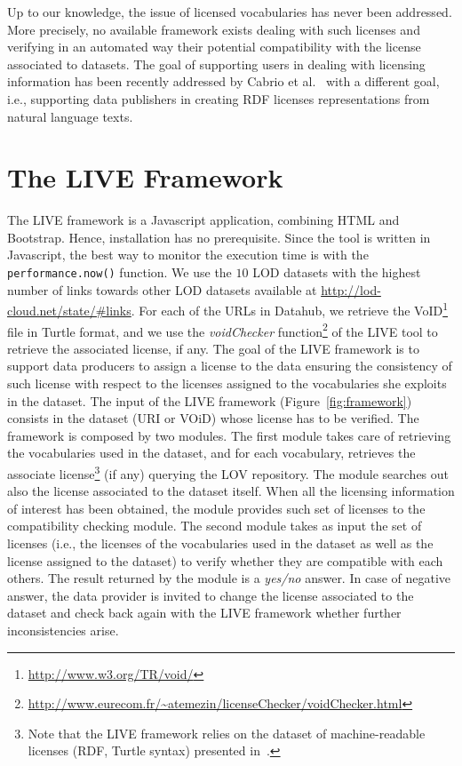 Up to our knowledge, the issue of licensed vocabularies has never been addressed. More precisely, no available framework exists dealing with such licenses and verifying in an automated way their potential compatibility with the license associated to datasets. The goal of supporting users in dealing with licensing information has been recently addressed by Cabrio et al.~\cite{CabrioESWC2014} with a different goal, i.e., supporting data publishers in creating RDF licenses representations from natural language texts. 

\section{The LIVE Framework}
\label{sec:live}
The LIVE framework is a Javascript application, combining HTML and Bootstrap. Hence, installation has no prerequisite. Since the tool is written in Javascript, the best way to monitor the execution time is with the \texttt{performance.now()} function. We use the $10$ LOD datasets with the highest number of links towards other LOD datasets available at \url{http://lod-cloud.net/state/#links}. For each of the URLs in Datahub, we retrieve the VoID\footnote{\url{http://www.w3.org/TR/void/}} file in Turtle format, and we use the \textit{voidChecker} function\footnote{\url{http://www.eurecom.fr/~atemezin/licenseChecker/voidChecker.html}} of the LIVE tool to retrieve the associated license, if any.  
The goal of the LIVE framework is to support data producers to assign a license to the data ensuring the consistency of such license with respect to the licenses assigned to the vocabularies she exploits in the dataset. 
The input of the LIVE framework (Figure~\ref{fig:framework}) consists in the dataset (URI or VOiD) whose license has to be verified. The framework is composed by two modules. The first module takes care of retrieving the vocabularies used in the dataset, and for each vocabulary, retrieves the associate license\footnote{Note that the LIVE framework relies on the dataset of machine-readable licenses (RDF, Turtle syntax) presented in~\cite{CabrioESWC2014}.} (if any) querying the LOV repository. 
The module searches out also the license associated to the dataset itself. When all the licensing information of interest has been obtained, the module provides such set of licenses to the compatibility checking module. 
The second module takes as input the set of licenses (i.e., the licenses of the vocabularies used in the dataset as well as the license assigned to the dataset) to verify whether they are compatible with each others. The result returned by the module is a \textit{yes/no} answer. In case of negative answer, the data provider is invited to change the license associated to the dataset and check back again with the LIVE framework whether further inconsistencies arise.

